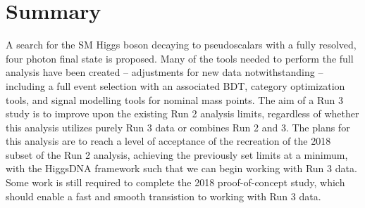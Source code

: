 \documentclass[12pt]{article}
\begin{document}


\section{Summary}
A search for the SM Higgs boson decaying to pseudoscalars with a fully resolved, four photon final state is proposed. Many of the tools needed to perform the full analysis have been created -- adjustments for new data notwithstanding -- including a full event selection with an associated BDT, category optimization tools, and signal modelling tools for nominal mass points. The aim of a Run 3 study is to improve upon the existing Run 2 analysis limits, regardless of whether this analysis utilizes purely Run 3 data or combines Run 2 and 3. The plans for this analysis are to reach a level of acceptance of the recreation of the 2018 subset of the Run 2 analysis, achieving the previously set limits at a minimum, with the HiggsDNA framework such that we can begin working with Run 3 data. Some work is still required to complete the 2018 proof-of-concept study, which should enable a fast and smooth transistion to working with Run 3 data.\par

\newpage
\printbibliography
\end{document}
